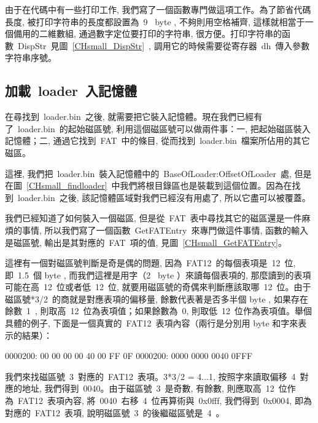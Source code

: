 由于在代碼中有一些打印工作, 我們寫了一個函數專門做這項工作。為了節省代碼長度, 被打印字符串的長度都設置為~9~ byte , 不夠則用空格補齊, 這樣就相當于一個備用的二維數組, 通過數字定位要打印的字符串, 很方便。打印字符串的函數~DispStr~見圖~\ref{CHsmall_DispStr}~, 調用它的時候需要從寄存器~dh~傳入參數字符串序號。

\label{CHsmall_DispStr}

\subsection{加載~loader~入記憶體}

在尋找到~loader.bin~之後, 就需要把它裝入記憶體。現在我們已經有了~loader.bin~的起始磁區號, 利用這個磁區號可以做兩件事：一, 把起始磁區裝入記憶體；二, 通過它找到~FAT~中的條目, 從而找到~loader.bin~檔案所佔用的其它磁區。

這裡, 我們把~loader.bin~裝入記憶體中的~BaseOfLoader:OffsetOfLoader~處, 但是在圖~\ref{CHsmall_findloader}~中我們將根目錄區也是裝載到這個位置。因為在找到~loader.bin~之後, 該記憶體區域對我們已經沒有用處了, 所以它盡可以被覆蓋。

我們已經知道了如何裝入一個磁區, 但是從~FAT~表中尋找其它的磁區還是一件麻煩的事情, 所以我們寫了一個函數~GetFATEntry~來專門做這件事情, 函數的輸入是磁區號, 輸出是其對應的~FAT~項的值, 見圖~\ref{CHsmall_GetFATEntry}。

\label{CHsmall_GetFATEntry}

這裡有一個對磁區號判斷是奇是偶的問題, 因為~FAT12~的每個表項是~12~位, 即~1.5~個 byte , 而我們這裡是用字（2~ byte ）來讀每個表項的, 那麼讀到的表項可能在高~12~位或者低~12~位, 就要用磁區號的奇偶來判斷應該取哪~12~位。由于磁區號*3/2~的商就是對應表項的偏移量, 餘數代表著是否多半個 byte , 如果存在餘數~1~, 則取高~12~位為表項值；如果餘數為~0, 則取低~12~位作為表項值。舉個具體的例子, 下面是一個真實的~FAT12~表項內容（兩行是分別用 byte 和字來表示的結果）：
\begin{Command}
0000200: 00 00 00 00 40 00 FF 0F
0000200:  0000  0000  0040  0FFF
\end{Command}
我們來找磁區號~3~對應的~FAT12~表項。3*3/2 = 4...1, 按照字來讀取偏移~4~對應的地址, 我們得到~0040。由于磁區號~3~是奇數, 有餘數, 則應取高~12~位作為~FAT12~表項內容, 將~0040~右移~4~位再算術與~0x0fff, 我們得到~0x0004, 即為對應的~FAT12~表項, 說明磁區號~3~的後繼磁區號是~4~。

